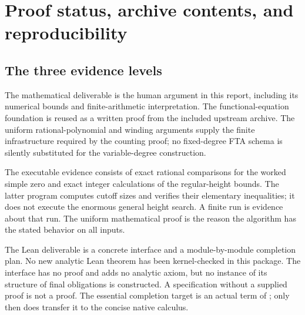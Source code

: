\section{Proof status, archive contents, and reproducibility}
\label{sec:status}

\subsection{The three evidence levels}
The mathematical deliverable is the human argument in this report,
including its numerical bounds and finite-arithmetic interpretation.
The functional-equation foundation is reused as a written proof from
the included upstream archive. The uniform rational-polynomial and
winding arguments supply the finite infrastructure required by the
counting proof; no fixed-degree FTA schema is silently substituted for
the variable-degree construction.

The executable evidence consists of exact rational comparisons for the
worked simple zero and exact integer calculations of the regular-height
bounds. The latter program computes cutoff sizes and verifies their
elementary inequalities; it does not execute the enormous general
height search. A finite run is evidence about that run. The uniform
mathematical proof is the reason the algorithm has the stated behavior
on all inputs.

The Lean deliverable is a concrete interface and a module-by-module
completion plan. No new analytic Lean theorem has been kernel-checked
in this package. The interface has no  proof and adds no
analytic axiom, but no instance of its structure of final obligations
is constructed. A specification without a supplied proof is not a proof. The essential
completion target is an actual term of
; only then does
 transfer it to the concise native calculus.

